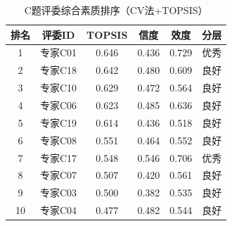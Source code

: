 \begin{table}[h]
\centering
\caption{C题评委综合素质排序（CV法+TOPSIS）}
\begin{tabular}{cccccc}
\hline
排名 & 评委ID & TOPSIS & 信度 & 效度 & 分层 \\
\hline
1 & 专家C01 & 0.646 & 0.436 & 0.729 & 优秀 \\
2 & 专家C18 & 0.642 & 0.480 & 0.609 & 良好 \\
3 & 专家C10 & 0.629 & 0.472 & 0.564 & 良好 \\
4 & 专家C06 & 0.623 & 0.485 & 0.636 & 良好 \\
5 & 专家C19 & 0.614 & 0.436 & 0.518 & 良好 \\
6 & 专家C08 & 0.551 & 0.464 & 0.552 & 良好 \\
7 & 专家C17 & 0.548 & 0.546 & 0.706 & 优秀 \\
8 & 专家C07 & 0.507 & 0.420 & 0.561 & 良好 \\
9 & 专家C03 & 0.500 & 0.382 & 0.535 & 良好 \\
10 & 专家C04 & 0.477 & 0.482 & 0.544 & 良好 \\
\hline
\end{tabular}
\end{table}